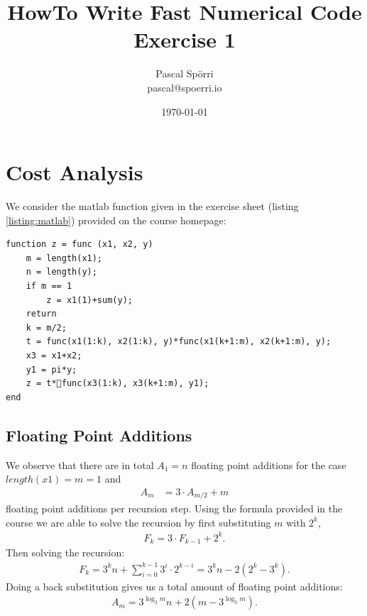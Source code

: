 \documentclass[portrait,a4paper]{article}
\begin{document}
 \author{Pascal Spörri\\pascal@spoerri.io}
 \title{HowTo Write Fast Numerical Code\\ Exercise 1}
 \date{\today}
\maketitle

\section{Cost Analysis}
We consider the matlab function given in the exercise sheet (listing \ref{listing:matlab}) provided on the course homepage:
\lstset{language=matlab}
\begin{lstlisting}[caption=Matlab code given in the exercise,label=listing:matlab]
function z = func (x1, x2, y)
    m = length(x1);
    n = length(y);
    if m == 1
        z = x1(1)+sum(y); 
    return    
    k = m/2;
    t = func(x1(1:k), x2(1:k), y)*func(x1(k+1:m), x2(k+1:m), y);
    x3 = x1+x2; 
    y1 = pi*y;
    z = t*func(x3(1:k), x3(k+1:m), y1);
end
\end{lstlisting}
\subsection{Floating Point Additions}
We observe that there are in total $A_1=n$ floating point additions for the case $length(x1)=m=1$ and 
\begin{align}
    A_m &= 3\cdot A_{m/2}+m
\end{align}
floating point additions per recursion step. Using the formula provided in the course we are able to solve the recursion by first substituting $m$ with $2^k$,
\begin{align}
    F_k = 3\cdot F_{k-1} + 2^k.
\end{align}
Then solving the recursion:
\begin{align}
    F_k = 3^k n + \sum_{i=0}^{k-1} 3^i \cdot 2^{k-i} = 3^k n - 2(2^k-3^k).
\end{align}
Doing a back substitution gives us a total amount of floating point additions:
\begin{align}
    A_m = 3^{\log_2{m}}n + 2(m-3^{\log_2{m}}).\label{eq:faAM}
\end{align}
\end{document}
